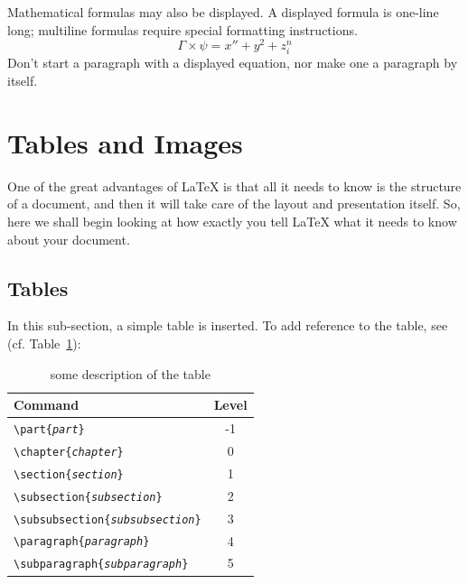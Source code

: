 \documentclass{article}      %
\begin{document}
Mathematical formulas may also be displayed.  A
displayed formula 
is 
one-line long; multiline
formulas require special formatting instructions.
  \[  \Gamma \times  \psi = x'' + y^{2} + z_{i}^{n}\]
Don't start a paragraph with a displayed equation,
nor make one a paragraph by itself.

\section{Tables and Images}
One of the great advantages of \LaTeX{} is that all it needs to know is
the structure of a document, and then it will take care of the layout
and presentation itself.  So, here we shall begin looking at how exactly
you tell \LaTeX{} what it needs to know about your document.

\subsection{Tables}
In this sub-section, a simple table is inserted. To add reference to the table, see (cf. Table~\hyperref[tab:table example]{\ref{tab:table example}}):

\begin{table}[htb]
        \centering
        \begin{tabular}{|p{}|c|}

		\hline  %
		Command & Level \\ \hline  %
		\texttt{\textbackslash part\{\emph{part}\}} & -1 \\
		\texttt{\textbackslash chapter\{\emph{chapter}\}} & 0 \\
		\texttt{\textbackslash section\{\emph{section}\}} & 1 \\
		\texttt{\textbackslash subsection\{\emph{subsection}\}} & 2 \\
		\texttt{\textbackslash subsubsection\{\emph{subsubsection}\}} & 3 \\
		\texttt{\textbackslash paragraph\{\emph{paragraph}\}} & 4 \\
		\texttt{\textbackslash subparagraph\{\emph{subparagraph}\}} & 5 \\
		\hline
		
	\end{tabular}
	\caption{some description of the table}
    \label{tab:table example}
\end{table}
\end{document}

